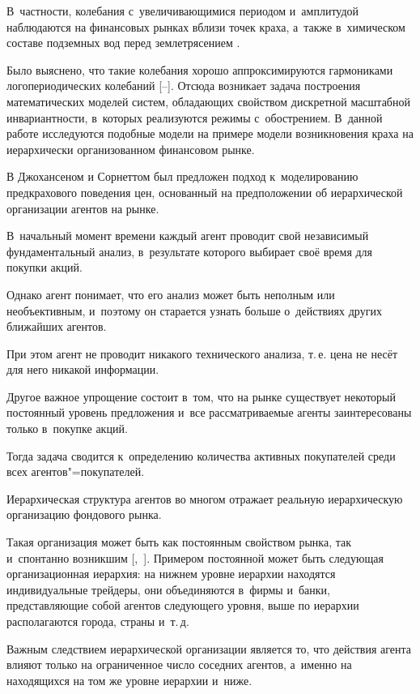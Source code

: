 В~частности, колебания с~увеличивающимися периодом и~амплитудой наблюдаются на финансовых рынках вблизи точек краха, а~также в~химическом составе подземных вод перед землетрясением \cite{ister:2}.

Было выяснено, что такие колебания хорошо аппроксимируются гармониками логопериодических колебаний [--]. Отсюда возникает задача построения математических моделей систем, обладающих свойством дискретной масштабной инвариантности, в~которых реализуются режимы с~обострением. В~данной работе исследуются подобные модели на примере модели возникновения краха на иерархически организованном финансовом рынке.



В \cite{ister:1} Джохансеном и Сорнеттом был предложен подход к~моделированию предкрахового поведения цен, основанный на предположении об иерархической организации агентов на рынке.

В~начальный момент времени каждый агент проводит свой независимый фундаментальный анализ, в~результате которого выбирает своё время для покупки акций.

Однако агент понимает, что его анализ может быть неполным или необъективным, и~поэтому он старается узнать больше о~действиях других ближайших агентов.

При этом агент не проводит никакого технического анализа, т.\,е. цена не несёт для него никакой информации.

Другое важное упрощение состоит в~том, что на рынке существует некоторый постоянный уровень предложения и~все рассматриваемые агенты заинтересованы только в~покупке акций.

Тогда задача сводится к~определению количества активных покупателей среди всех агентов"=покупателей.

Иерархическая структура агентов во многом отражает реальную иерархическую организацию фондового рынка.

Такая организация может быть как постоянным свойством рынка, так и~спонтанно возникшим [,~]. Примером постоянной может быть следующая организационная иерархия: на нижнем уровне иерархии находятся индивидуальные трейдеры, они объединяются в~фирмы и~банки, представляющие собой агентов следующего уровня, выше по иерархии располагаются города, страны и~т.\,д.

Важным следствием иерархической организации является то, что действия агента влияют только на ограниченное число соседних агентов, а~именно на находящихся на том же уровне иерархии и~ниже.

